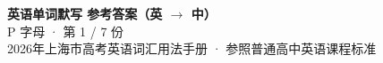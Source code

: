 \documentclass[10pt,a4paper]{article}
\begin{document}
\pagestyle{plain}

\begin{center}
{\LARGE\bfseries 英语单词默写 \quad 参考答案（英 $\to$ 中）}\\[0.22em]
{\large P 字母 · 第 1 / 7 份}\\[0.18em]
{\small 2026年上海市高考英语词汇用法手册 · 参照普通高中英语课程标准}
\end{center}

\vspace{0.2em}
\noindent{\color{rulegray}\rule{\textwidth}{0.8pt}}

\vspace{0.35em}

\vspace{0.25em}
\renewcommand{\arraystretch}{1.32}
\end{document}
